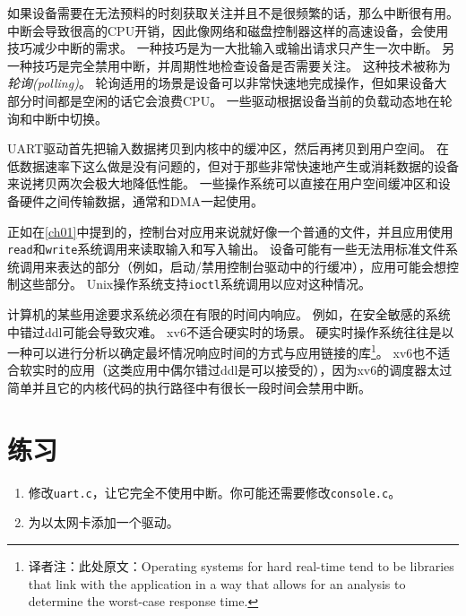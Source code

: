 如果设备需要在无法预料的时刻获取关注并且不是很频繁的话，那么中断很有用。
中断会导致很高的CPU开销，因此像网络和磁盘控制器这样的高速设备，会使用技巧减少中断的需求。
一种技巧是为一大批输入或输出请求只产生一次中断。
另一种技巧是完全禁用中断，并周期性地检查设备是否需要关注。
这种技术被称为\emph{轮询(polling)}。
轮询适用的场景是设备可以非常快速地完成操作，但如果设备大部分时间都是空闲的话它会浪费CPU。
一些驱动根据设备当前的负载动态地在轮询和中断中切换。

UART驱动首先把输入数据拷贝到内核中的缓冲区，然后再拷贝到用户空间。
在低数据速率下这么做是没有问题的，但对于那些非常快速地产生或消耗数据的设备来说拷贝两次会极大地降低性能。
一些操作系统可以直接在用户空间缓冲区和设备硬件之间传输数据，通常和DMA一起使用。

正如在\autoref{ch01}中提到的，控制台对应用来说就好像一个普通的文件，并且应用使用\texttt{read}和\texttt{write}系统调用来读取输入和写入输出。
设备可能有一些无法用标准文件系统调用来表达的部分（例如，启动/禁用控制台驱动中的行缓冲），应用可能会想控制这些部分。
Unix操作系统支持\texttt{ioctl}系统调用以应对这种情况。

计算机的某些用途要求系统必须在有限的时间内响应。
例如，在安全敏感的系统中错过ddl可能会导致灾难。
xv6不适合硬实时的场景。
硬实时操作系统往往是以一种可以进行分析以确定最坏情况响应时间的方式与应用链接的库\footnote{译者注：此处原文：Operating systems for hard real-time tend to be libraries that link with the application in a way that allows for an analysis to determine the worst-case response time.}。
xv6也不适合软实时的应用（这类应用中偶尔错过ddl是可以接受的），因为xv6的调度器太过简单并且它的内核代码的执行路径中有很长一段时间会禁用中断。

\section{练习}
\begin{enumerate}
    \item 修改\texttt{uart.c}，让它完全不使用中断。你可能还需要修改\texttt{console.c}。
    \item 为以太网卡添加一个驱动。
\end{enumerate}


